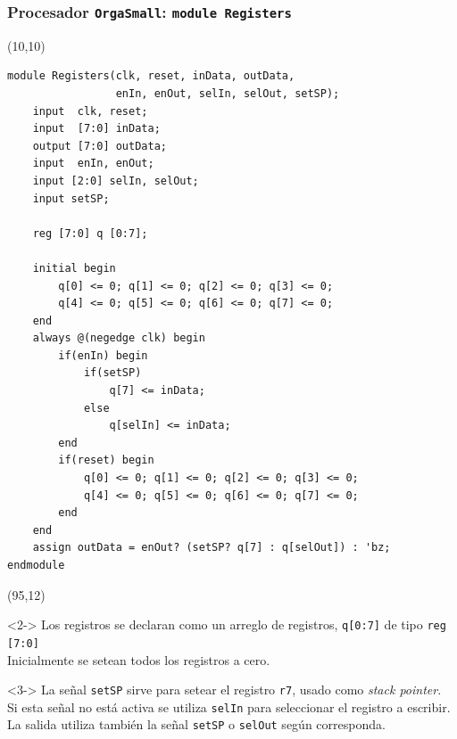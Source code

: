 \documentclass[aspectratio=169]{beamer}
\begin{document}
\begin{frame}[fragile,t]
    \frametitle{Procesador \texttt{OrgaSmall}: \texttt{module Registers}}
    \begin{textblock}{80}(10,10)
\lstset{basicstyle=\tiny}
\begin{lstlisting}
module Registers(clk, reset, inData, outData,
                 enIn, enOut, selIn, selOut, setSP);
    input  clk, reset;
    input  [7:0] inData;
    output [7:0] outData;
    input  enIn, enOut;
    input [2:0] selIn, selOut;
    input setSP;
    
    reg [7:0] q [0:7];
    
    initial begin
        q[0] <= 0; q[1] <= 0; q[2] <= 0; q[3] <= 0;
        q[4] <= 0; q[5] <= 0; q[6] <= 0; q[7] <= 0;
    end
    always @(negedge clk) begin
        if(enIn) begin
            if(setSP)
                q[7] <= inData;
            else
                q[selIn] <= inData;
        end
        if(reset) begin
            q[0] <= 0; q[1] <= 0; q[2] <= 0; q[3] <= 0;
            q[4] <= 0; q[5] <= 0; q[6] <= 0; q[7] <= 0;
        end
    end
    assign outData = enOut? (setSP? q[7] : q[selOut]) : 'bz;
endmodule
\end{lstlisting}
    \end{textblock}
    \begin{textblock}{55}(95,12)
    \begin{onlyenv}<2->
    \small
    Los registros se declaran como un arreglo de registros, \texttt{q[0:7]} de tipo \texttt{reg [7:0]}\\
    \bigskip
    \textcolor{verdeuca}{Inicialmente se setean todos los registros a cero.}\\
    \end{onlyenv}
    \bigskip
    \begin{onlyenv}<3->
    La señal \texttt{setSP} sirve para setear el registro \texttt{r7}, usado como \emph{stack pointer}.\\
    \bigskip
    Si esta señal no está activa se utiliza \texttt{selIn} para seleccionar el registro a escribir.\\
    \bigskip
    \textcolor{verdeuca}{La salida utiliza también la señal \texttt{setSP} o \texttt{selOut} según corresponda.}
    \end{onlyenv}
    \end{textblock}
\end{frame}
\end{document}
